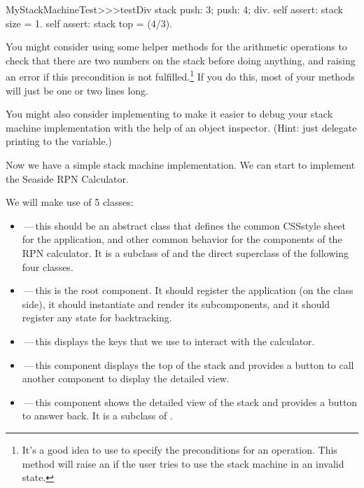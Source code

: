 \documentclass[a4paper,10pt,twoside]{book}
\begin{document}

\begin{code}{}
MyStackMachineTest>>>testDiv
	stack
		push: 3;
		push: 4;
		div.
	self assert: stack size = 1.
	self assert: stack top = (4/3).
\end{code}

You might consider using some helper methods for the arithmetic operations to check that
there are two numbers on the stack before doing anything, and raising an error if this
precondition is not fulfilled.\footnote{It's a good idea to use  to
specify the preconditions for an operation.
This method will raise an  if the user tries to use the stack
machine in an invalid state.}
If you do this, most  of your methods will just be one or two lines long.

You might also consider implementing  to make it easier to
debug your stack machine implementation with the help of an object inspector.
(Hint: just delegate printing to the  variable.)


Now we have a simple stack machine implementation.
We can start to implement the Seaside RPN Calculator.

We will make use of 5 classes:
\begin{itemize}
\item {}\,---\,this should be an abstract class that defines the common CSSstyle sheet for the application, and other common behavior for the components of the RPN
calculator.
It is a subclass of  and the direct superclass of the following four
classes.
  
    \item {}\,---\,this is the root component.
It should register the application (on the class side), it should instantiate and render
its subcomponents, and it should register any state for backtracking.
\item {}\,---\,this displays the keys that we use to interact with the
calculator.
\item {}\,---\,this component displays the top of the stack and provides a
button to call another component to display the detailed view.
\item {}\,---\,this component shows the detailed view of the stack and
provides a button to answer back.
  It is a subclass of .
\end{itemize}
\end{document}

